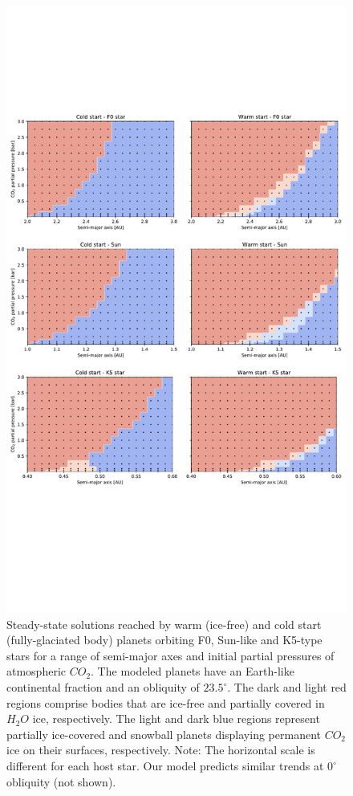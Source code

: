 \documentclass[fleqn,usenatbib]{mnras}
\begin{document}
\begin{figure}
	\includegraphics[width=\textwidth]{Figures/Steady_state_all.pdf}
    \caption{Steady-state solutions reached by warm (ice-free) and cold start (fully-glaciated body) planets orbiting F0, Sun-like and K5-type stars for a range of semi-major axes and initial partial pressures of atmospheric $CO_{\mathrm{2}}$. The modeled planets have an Earth-like continental fraction and an obliquity of $23.5^{\circ}$. The dark and light red regions comprise bodies that are ice-free and partially covered in $H_{\mathrm{2}}O$ ice, respectively. The light and dark blue regions represent partially ice-covered and snowball planets displaying permanent $CO_{\mathrm{2}}$ ice on their surfaces, respectively. Note: The horizontal scale is different for each host star. Our model predicts similar trends at $0^{\circ}$ obliquity (not shown).} 
    \label{fig:ss_all}
\end{figure}
\end{document}
